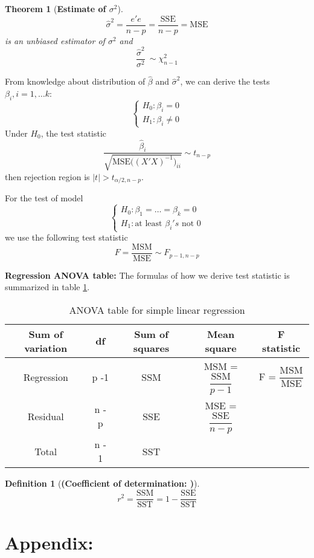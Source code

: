 \documentclass[11pt]{article}
\newtheorem{thm}{Theorem}[subsection]
\newtheorem{df}{Definition}[section]
\begin{document}
\begin{thm}[\textbf{Estimate of $\sigma^2$}] 
	$$\hat{\sigma}^2 = \dfrac{e'e}{n - p} = \dfrac{\text{SSE}}{n - p} = \text{MSE}$$ is an unbiased estimator of $\sigma^2$ and 
	$$\dfrac{\hat{\sigma}^2}{\sigma^2} ~ \sim \chi^2_{n - 1}$$
\end{thm}

From knowledge about distribution of $\hat{\beta}$ and $\hat{\sigma}^2$, we can derive the tests $\beta_i, i = 1, \dots k$:
$$\begin{cases}
	H_0: \beta_i = 0 \\ H_1: \beta_i \neq 0
\end{cases} $$
Under $H_0$, the test statistic 
$$\dfrac{\hat{\beta}_i}{\sqrt{\text{MSE} \big((X'X)^{-1}\big)_{ii}}}  \sim t_{n - p}$$
then rejection region is $|t| > t_{\alpha/2, n - p}$.

For the test of model
$$\begin{cases}
	H_0: \beta_1 = \dots = \beta_k = 0 \\ H_1: \text{at least } \beta_i's \text{ not } 0
\end{cases} $$ we use the following test statistic
$$ F = \dfrac{\text{MSM}}{\text{MSE}} \sim F_{p-1, n - p}$$

\textbf{Regression ANOVA table: }The formulas of how we derive test statistic is summarized in table \ref{table: Reg-ANOVA-full}.
\begin{table}[h]
	\centering
	\begin{tabular}{c c c c c } 
		\hline
		Sum of variation & df & Sum of squares & Mean square & F statistic \\
		\hline
		Regression & p -1 & SSM & MSM = $\dfrac{\text{SSM}}{p - 1}$ & F = $\dfrac{\text{MSM}}{\text{MSE}} $\\
		Residual & n - p & SSE  & MSE = $\dfrac{\text{SSE}}{n - p}$ & \\
		\hline
		Total & n - 1 & SST & & \\
		\hline
	\end{tabular}
	\caption{ANOVA table for simple linear regression }
	\label{table: Reg-ANOVA-full}
\end{table}

\begin{df}[\textbf{(Coefficient of determination: )}]
	$$r^2 = \dfrac{\text{SSM}}{\text{SST}} = 1 - \dfrac{\text{SSE}}{\text{SST}}$$
\end{df}


\section{Appendix: }
\end{document}
